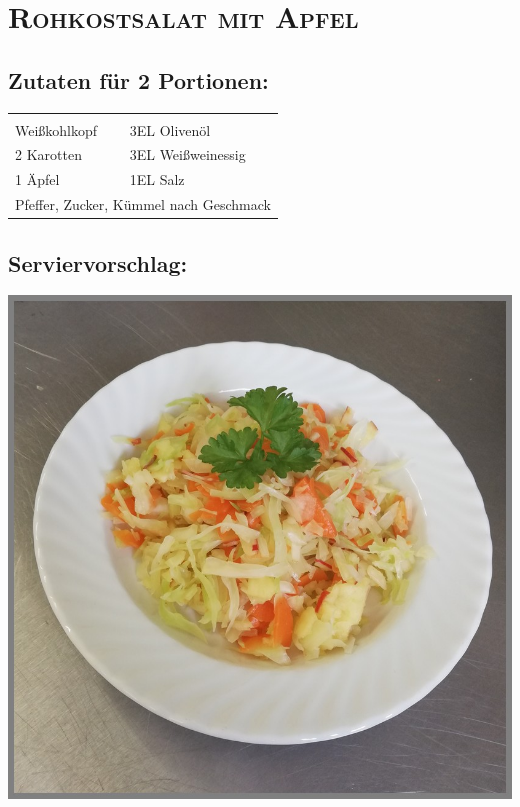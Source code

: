 \section{\textsc{Rohkostsalat mit Apfel}}

\subsection*{Zutaten für 2 Portionen:}

\begin{tabular}{p{7.5cm} p{7.5cm}}
	& \\
	\sfrac{1}{2} Weißkohlkopf & 3EL Olivenöl \\
	2 Karotten & 3EL Weißweinessig \\
	1 Äpfel & 1EL Salz \\
	\multicolumn{2}{l}{Pfeffer, Zucker, Kümmel nach Geschmack}
\end{tabular}

\subsection*{Serviervorschlag:}

\includegraphics[width=\textwidth]{img/krautsalat_apfel.jpg} \cite{rohkostapfel}

